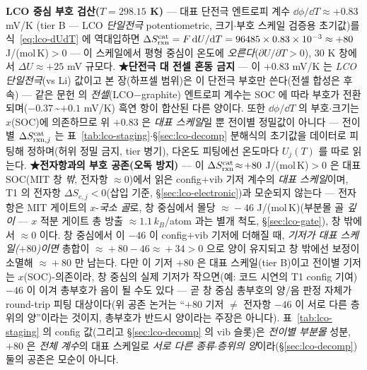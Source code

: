 \begin{verifybox}
\textbf{LCO 중심 부호 검산($T=298.15$ K)} --- 대표 단전극 엔트로피 계수 $\dd\phi/\dd T\approx+0.83$ mV/K\cite{swiderska2019}
(tier B --- LCO \emph{단일전극} potentiometric, 크기$\cdot$부호 스케일 검증용 초기값)를 식~\eqref{eq:lco-dUdT}
에 역대입하면 $\Delta S_{\mathrm{rxn}}^\mathrm{cat}=F\,\mathrm{d} U/\mathrm{d} T=96485\times0.83\times10^{-3}\approx+80$ J/(mol\,K)$>0$ ---
이 스케일에서 평형 중심이 온도에 \emph{오른다}($\partial U/\partial T>0$), $30$ K 창에서 $\Delta U\approx+25$ mV 규모다.
\textbf{★단전극 대 전셀 혼동 금지} --- 이 $+0.83$ mV/K 는 \emph{LCO 단일전극}(vs Li) 값이고 본 장(하프셀
범위)은 이 단전극 부호만 쓴다(전셀 합성은 후속) --- 같은 문헌\cite{swiderska2019} 의 \emph{전셀}(LCO$-$graphite) 엔트로피 계수는
SOC 에 따라 부호가 전환되며($-0.37$\,\textasciitilde$+0.1$ mV/K) 흑연 항이 합산된 다른 양이다. 또한
$\dd\phi/\dd T$ 의 부호$\cdot$크기는 $x$(SOC)에 의존하므로 위 $+0.83$ 은 \emph{대표 스케일}일 뿐 전이별
정밀값이 아니다 --- 전이별 $\Delta S_{\mathrm{rxn},j}^\mathrm{cat}$ 는 표~\ref{tab:lco-staging}$\cdot$\S\ref{sec:lco-decomp}
분해식의 초기값을 데이터로 피팅해 정하며(허위 정밀 금지, tier 병기), 다온도 피팅에선 온도마다 $U_j(T)$ 를 따로 읽는다.
\textbf{★전자항과의 부호 공존(오독 방지)} --- 이 $\Delta S_{\mathrm{rxn}}^\mathrm{cat}\!\approx\!+80$ J/(mol\,K)$>0$ 은
대표 SOC(MIT 창 \emph{밖}, 전자항 $\approx\!0$)에서 읽은 config$+$vib 기저 계수의 \emph{대표 스케일}이며,
T1 의 전자항 $\Delta S_{e,j}<0$(삽입 기준, \S\ref{sec:lco-electronic})과 모순되지 않는다 --- 전자항은 MIT 게이트의
$x$-\emph{국소 골}로, 창 중심에서 몰당 $\approx\!-46$ J/(mol\,K)(부분몰 골 \emph{깊이} --- $x$ 적분 게이트 총 방출 $\approx\!1.1\,k_B$/atom 과는 별개 척도,
\S\ref{sec:lco-gate}), 창 밖에서 $\approx\!0$ 이다. 창 중심에서 이 $-46$ 이 config$+$vib 기저에 더해질 때, \emph{기저가 대표 스케일($+80$)이면} 총합이 $\approx\!+80-46\approx\!+34>0$ 으로
양이 유지되고 창 밖에선 보정이 소멸해 $\approx\!+80$ 만 남는다. 다만 이 기저 $+80$ 은 대표 스케일(tier B)이고
전이별 기저는 $x$(SOC)-의존이라, 창 중심의 실제 기저가 작으면(예: 코드 시연의 T1 config 기여) $-46$ 이 이겨 총부호가
음이 될 수도 있다 --- 곧 창 중심 총부호의 양/음 판정 자체가 round-trip 피팅 대상이다(위 공존 논거는 ``$+80$
기저 $\ne$ 전자항 $-46$ 이 서로 다른 층위의 양''이라는 것이지, 총부호가 반드시 양이라는 주장은 아니다). 표~\ref{tab:lco-staging}
의 config 값(그리고 \S\ref{sec:lco-decomp} 의 vib 슬롯)은 \emph{전이별 부분몰} 성분, $+80$ 은 \emph{전체 계수}의 대표 스케일로 \emph{서로 다른
종류$\cdot$층위의 양}이라(\S\ref{sec:lco-decomp}) 둘의 공존은 모순이 아니다.
\end{verifybox}

